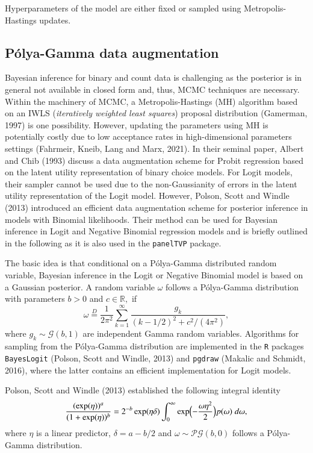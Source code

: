 \documentclass[a4paper, preprint, 3p,
authoryear]{elsarticle} %
\begin{document}
Hyperparameters of the model are either fixed or sampled using
Metropolis-Hastings updates.

\subsection{Pólya-Gamma data
augmentation}\label{puxf3lya-gamma-data-augmentation}

Bayesian inference for binary and count data is challenging as the
posterior is in general not available in closed form and, thus, MCMC
techniques are necessary. Within the machinery of MCMC, a
Metropolis-Hastings (MH) algorithm based on an IWLS
(\textit{iteratively weighted least squares}) proposal distribution
(Gamerman, 1997) is one possibility. However, updating the parameters
using MH is potentially costly due to low acceptance rates in
high-dimensional parameters settings (Fahrmeir, Kneib, Lang and Marx,
2021). In their seminal paper, Albert and Chib (1993) discuss a data
augmentation scheme for Probit regression based on the latent utility
representation of binary choice models. For Logit models, their sampler
cannot be used due to the non-Gaussianity of errors in the latent
utility representation of the Logit model. However, Polson, Scott and
Windle (2013) introduced an efficient data augmentation scheme for
posterior inference in models with Binomial likelihoods. Their method
can be used for Bayesian inference in Logit and Negative Binomial
regression models and is briefly outlined in the following as it is also
used in the \texttt{panelTVP} package.

The basic idea is that conditional on a Pólya-Gamma distributed random
variable, Bayesian inference in the Logit or Negative Binomial model is
based on a Gaussian posterior. A random variable \(\omega\) follows a
Pólya-Gamma distribution with parameters \(b > 0\) and
\(c \in \mathbb{R},\) if \begin{equation*}
    \omega \overset{D}{=} \frac{1}{2\pi^2}\sum_{k=1}^\infty \frac{g_k}{(k-1/2)^2+c^2/(4\pi^2)},
\end{equation*} where \(g_k \sim \mathcal{G}(b,1)\) are independent
Gamma random variables. Algorithms for sampling from the Pólya-Gamma
distribution are implemented in the \texttt{R} packages
\texttt{BayesLogit} (Polson, Scott and Windle, 2013) and \texttt{pgdraw}
(Makalic and Schmidt, 2016), where the latter contains an efficient
implementation for Logit models.

Polson, Scott and Windle (2013) established the following integral
identity \begin{equation}
\label{Integral}
    \frac{(\exp(\eta))^a}{(1+\exp(\eta))^b} = 2 ^{-b}\exp(\eta\delta)\int_0^\infty \exp\Bigl(-\frac{\omega\eta^2}{2}\Bigr) p(\omega) \; d\omega,
\end{equation} where \(\eta\) is a linear predictor, \(\delta = a-b/2\)
and \(\omega \sim \mathcal{PG}(b,0)\) follows a Pólya-Gamma
distribution.
\end{document}
